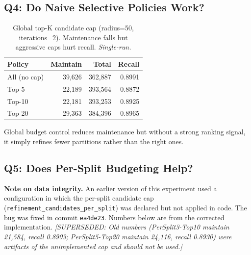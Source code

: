 \documentclass[sigconf, nonacm]{acmart}
\newcommand{\superseded}[1]{\textit{[SUPERSEDED: #1]}}
\begin{document}
\subsection{Q4: Do Naive Selective Policies Work?}
\label{sec:eval_q4}

\begin{table}[h]
\centering
\caption{Global top-K candidate cap (radius=50, iterations=2).
  Maintenance falls but aggressive caps hurt recall. \textit{Single-run.}}
\label{tab:topk}
\begin{tabular}{lrrr}
  \toprule
  Policy & Maintain & Total & Recall \\
  \midrule
  All (no cap) &  39,626 & 362,887 & 0.8991 \\
  Top-5        &  22,189 & 393,564 & 0.8872 \\
  Top-10       &  22,181 & 393,253 & 0.8925 \\
  Top-20       &  29,363 & 384,396 & 0.8965 \\
  \bottomrule
\end{tabular}
\end{table}

Global budget control reduces maintenance but without a strong ranking
signal, it simply refines fewer partitions rather than the right ones.

\subsection{Q5: Does Per-Split Budgeting Help?}
\label{sec:eval_q5}

\textbf{Note on data integrity.}
An earlier version of this experiment used a configuration in which the
per-split candidate cap (\texttt{refinement\_candidates\_per\_split})
was declared but not applied in code. The bug was fixed in commit
\texttt{ea4de23}. Numbers below are from the corrected implementation.
\superseded{Old numbers (PerSplit3-Top10 maintain 21,584, recall 0.8903;
PerSplit5-Top20 maintain 24,116, recall 0.8930) were artifacts of the
unimplemented cap and should not be used.}
\end{document}
